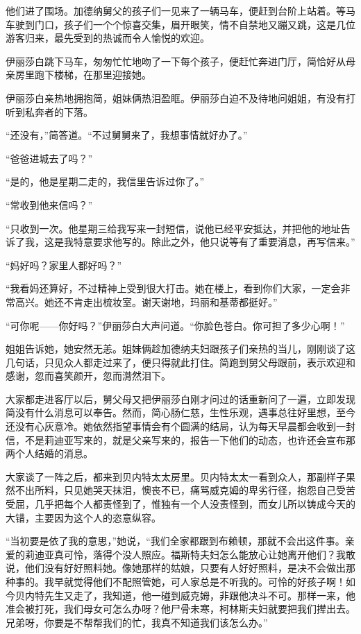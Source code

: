 \par 他们进了围场。加德纳舅父的孩子们一见来了一辆马车，便赶到台阶上站着。等马车驶到门口，孩子们一个个惊喜交集，眉开眼笑，情不自禁地又蹦又跳，这是几位游客归来，最先受到的热诚而令人愉悦的欢迎。
\par 伊丽莎白跳下马车，匆匆忙忙地吻了一下每个孩子，便赶忙奔进门厅，简恰好从母亲房里跑下楼梯，在那里迎接她。
\par 伊丽莎白亲热地拥抱简，姐妹俩热泪盈眶。伊丽莎白迫不及待地问姐姐，有没有打听到私奔者的下落。
\par “还没有，”简答道。“不过舅舅来了，我想事情就好办了。”
\par “爸爸进城去了吗？”
\par “是的，他是星期二走的，我信里告诉过你了。”
\par “常收到他来信吗？”
\par “只收到一次。他星期三给我写来一封短信，说他已经平安抵达，并把他的地址告诉了我，这是我特意要求他写的。除此之外，他只说等有了重要消息，再写信来。”
\par “妈好吗？家里人都好吗？”
\par “我看妈还算好，不过精神上受到很大打击。她在楼上，看到你们大家，一定会非常高兴。她还不肯走出梳妆室。谢天谢地，玛丽和基蒂都挺好。”
\par “可你呢——你好吗？”伊丽莎白大声问道。“你脸色苍白。你可担了多少心啊！”
\par 姐姐告诉她，她安然无恙。姐妹俩趁加德纳夫妇跟孩子们亲热的当儿，刚刚谈了这几句话，只见众人都走过来了，便只得就此打住。简跑到舅父母跟前，表示欢迎和感谢，忽而喜笑颜开，忽而潸然泪下。
\par 大家都走进客厅以后，舅父母又把伊丽莎白刚才问过的话重新问了一遍，立即发现简没有什么消息可以奉告。然而，简心肠仁慈，生性乐观，遇事总往好里想，至今还没有心灰意冷。她依然指望事情会有个圆满的结局，认为每天早晨都会收到一封信，不是莉迪亚写来的，就是父亲写来的，报告一下他们的动态，也许还会宣布那两个人结婚的消息。
\par 大家谈了一阵之后，都来到贝内特太太房里。贝内特太太一看到众人，那副样子果然不出所料，只见她哭天抹泪，懊丧不已，痛骂威克姆的卑劣行径，抱怨自己受苦受屈，几乎把每个人都责怪到了，惟独有一个人没责怪到，而女儿所以铸成今天的大错，主要因为这个人的恣意纵容。
\par “当初要是依了我的意思，”她说，“我们全家都跟到布赖顿，那就不会出这件事。亲爱的莉迪亚真可怜，落得个没人照应。福斯特夫妇怎么能放心让她离开他们？我敢说，他们没有好好照料她。像她那样的姑娘，只要有人好好照料，是决不会做出那种事的。我早就觉得他们不配照管她，可人家总是不听我的。可怜的好孩子啊！如今贝内特先生又走了，我知道，他一碰到威克姆，非跟他决斗不可。那样一来，他准会被打死，我们母女可怎么办呀？他尸骨未寒，柯林斯夫妇就要把我们撵出去。兄弟呀，你要是不帮帮我们的忙，我真不知道我们该怎么办。”
